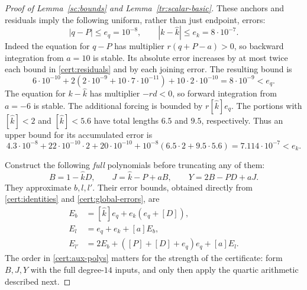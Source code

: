 \documentclass[11pt]{article}
\theoremstyle{definition}
\theoremstyle{remark}
\numberwithin{equation}{section}
\begin{document}
\begin{proof}[Proof of Lemma~\ref{sc:bounds} and Lemma~\ref{tr:scalar-basic}]
These anchors and residuals imply the following
uniform, rather than just endpoint, errors:
\begin{equation}\label{cert:global-errors}
 |q-P|\le e_q=10^{-8},\qquad |k-\widehat k|\le e_k=8\cdot10^{-7}.
\end{equation}
Indeed the equation for $q-P$ has multiplier $r(q+P-a)>0$, so backward
integration from $a=10$ is stable. Its absolute error increases by at most
twice each bound in \eqref{cert:residuals} and by each joining error.
The resulting bound is
\[
 6\cdot10^{-10}+2(2\cdot10^{-9}+10\cdot7\cdot10^{-11})
       +10\cdot2\cdot10^{-10}=8\cdot10^{-9}<e_q.
\]
The equation for $k-\widehat k$ has multiplier $-rd<0$, so forward integration
from $a=-6$ is stable. The additional forcing is bounded by $r[\widehat k]e_q$.
The portions with $[\widehat k]<2$ and $[\widehat k]<5.6$ have total lengths $6.5$ and
$9.5$, respectively. Thus an upper bound for its accumulated error is
\[
 4.3\cdot10^{-8}+22\cdot10^{-10}\cdot2
       +20\cdot10^{-10}
       +10^{-8}(6.5\cdot2+9.5\cdot5.6)
 =7.114\cdot10^{-7}<e_k.
\]

Construct the following \emph{full} polynomials before truncating any of
them:
\begin{equation}\label{cert:aux-polys}
 B=1-\widehat k D,\qquad J=\widehat k-P+aB,\qquad Y=2B-PD+aJ.
\end{equation}
They approximate $b,l,l'$. Their error bounds, obtained directly from
\eqref{cert:identities} and \eqref{cert:global-errors}, are
\begin{equation}\label{cert:aux-errors}
 \begin{split}
 E_b&=[\widehat k]e_q+e_k(e_q+[D]),\\
 E_l&=e_q+e_k+[a]E_b,\\
 E_{l'}&=2E_b+([P]+[D]+e_q)e_q+[a]E_l.
 \end{split}
\end{equation}
The order in \eqref{cert:aux-polys} matters for the strength of the
certificate: form $B,J,Y$ with the full degree-$14$ inputs, and only then
apply the quartic arithmetic described next.


\end{proof}
\end{document}
